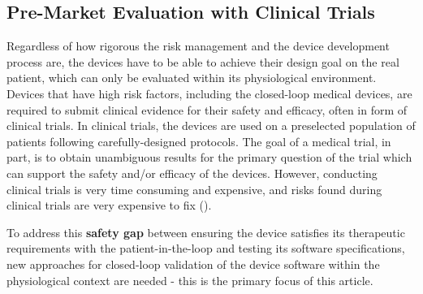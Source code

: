 \subsection{Pre-Market Evaluation with Clinical Trials}
Regardless of how rigorous the risk management and the device development process are, the devices have to be able to achieve their design goal on the real patient, which can only be evaluated within its physiological environment. Devices that have high risk factors, including the closed-loop medical devices, are required to submit clinical evidence for their safety and efficacy, often in form of clinical trials. In clinical trials, the devices are used on a preselected population of patients following carefully-designed protocols. The goal of a medical trial, in part, is  to obtain unambiguous results for the primary question of the trial which can support the safety and/or efficacy of the devices. However, conducting clinical trials is very time consuming and expensive, and risks found during clinical trials are very expensive to fix (\cite{trialcost}). 

To address this \textbf{safety gap} between ensuring the device satisfies its therapeutic requirements with the patient-in-the-loop and testing its software specifications, new approaches for closed-loop validation of the device software within the physiological context are needed - this is the primary focus of this article.


